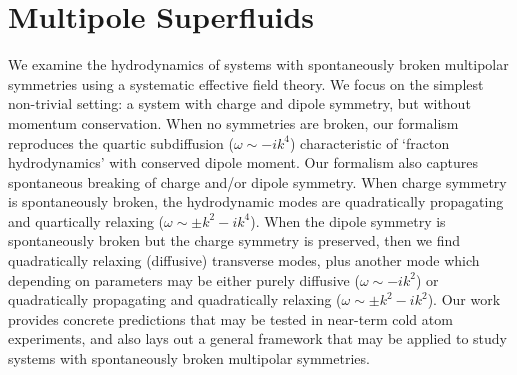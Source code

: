 
%
%
%
% 
%	
%	
%
%	

\chapter{Multipole Superfluids}\label{chp:superfluids}

We examine the hydrodynamics of systems with spontaneously broken multipolar symmetries using a systematic effective field theory. We focus on the simplest non-trivial setting: a system with charge and dipole symmetry, but without momentum conservation. When no symmetries are broken, our formalism reproduces the quartic subdiffusion ($\omega \sim -i k^4$) characteristic of `fracton hydrodynamics' with conserved dipole moment. Our formalism also captures spontaneous breaking of charge and/or dipole symmetry. When charge symmetry is spontaneously broken, the hydrodynamic modes are quadratically propagating and quartically relaxing ($\omega \sim \pm k^2 - ik^4$). When the dipole symmetry is spontaneously broken but the charge symmetry is preserved, then we find quadratically relaxing (diffusive) transverse modes, plus another mode which depending on parameters may be either purely diffusive ($\omega \sim -i k^2$) or quadratically propagating and quadratically relaxing ($\omega \sim \pm k^2 -i k^2$). Our work provides concrete predictions that may be tested in near-term cold atom experiments, and also lays out a general framework that may be applied to study systems with spontaneously broken multipolar symmetries. 

